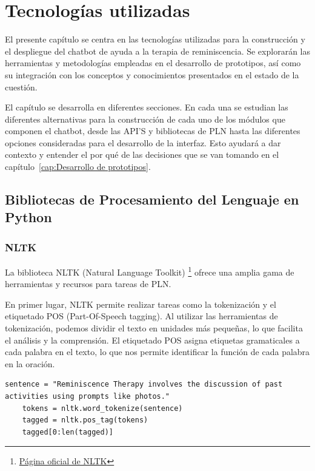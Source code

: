 \chapter{Tecnologías utilizadas}
\label{cap:TecnologiasUtilizadas}

El presente capítulo se centra en las tecnologías utilizadas para la construcción y el despliegue del chatbot de ayuda a la terapia de reminiscencia. Se explorarán las herramientas y metodologías empleadas en el desarrollo de prototipos, así como su integración con los conceptos y conocimientos presentados en el estado de la cuestión. 

El capítulo se desarrolla en diferentes secciones. En cada una se estudian las diferentes alternativas para la construcción de cada uno de los módulos que componen el chatbot, desde las API'S y bibliotecas de PLN hasta las diferentes opciones consideradas para el desarrollo de la interfaz. Esto ayudará a dar contexto y entender el por qué de las decisiones que se van tomando en el capítulo~\ref{cap:Desarrollo de prototipos}.


\section{Bibliotecas de Procesamiento del Lenguaje en Python}

\subsection{NLTK}
La biblioteca NLTK (Natural Language Toolkit) \footnote{\href{https://www.nltk.org/}{Página oficial de NLTK}} ofrece una amplia gama de herramientas y recursos para tareas de PLN.

En primer lugar, NLTK permite realizar tareas como la tokenización y el  etiquetado POS (Part-Of-Speech tagging). Al utilizar las herramientas de tokenización, podemos dividir el texto en unidades más pequeñas, lo que facilita el análisis y la comprensión. El etiquetado POS asigna etiquetas gramaticales a cada palabra en el texto, lo que nos permite identificar la función de cada palabra en la oración. \\

\begin{lstlisting}[style=SpyderStyle, caption={Ejemplo de código en Python. Se pueden consultar más ejemplos en \cite{bird2009natural}}, captionpos=b, label={lst:python},breaklines = true]
	sentence = "Reminiscence Therapy involves the discussion of past activities using prompts like photos."
	tokens = nltk.word_tokenize(sentence)
	tagged = nltk.pos_tag(tokens)
	tagged[0:len(tagged)]
\end{lstlisting}

